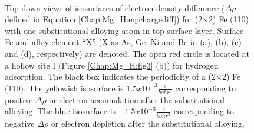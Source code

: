 \newpage
\begingroup
\begin{figure}[!ht]
  \centering
  \label{Chap:Mg_H:fig:9a}
  \label{Chap:Mg_H:fig:9b}
  \\
  \label{Chap:Mg_H:fig:9c}
  \label{Chap:Mg_H:fig:9d}
\caption[Top-down views of isosurfaces of electron density difference for (2$\times$2) Fe (110) with one substitutional alloying atom in top surface layer]{Top-down views of isosurfaces of electron density difference ($\Delta \rho$ defined in Equation \ref{Chap:Mg_H:eq:chargediff}) for (2$\times$2) Fe (110) with one substitutional alloying atom in top surface layer. Surface Fe and alloy element ``X'' (X as As, Ge. Ni and Be in (a), (b), (c) and (d), respectively) are denoted. The open red circle is located at a hollow site I (Figure \ref{Chap:Mg_H:fig3} (b)) for hydrogen adsorption. The black box indicates the periodicity of a (2$\times$2) Fe (110). The yellowish isosurface is $1.5x10^{-3}\frac{e}{bohr^3}$ corresponding to positive $\Delta \rho$ or electron accumulation after the substitutional alloying. The blue isosurface is $-1.5x10^{-3}\frac{e}{bohr^3}$ corresponding to negative $\Delta \rho$ or electron depletion after the substitutional alloying.}

\end{figure}
